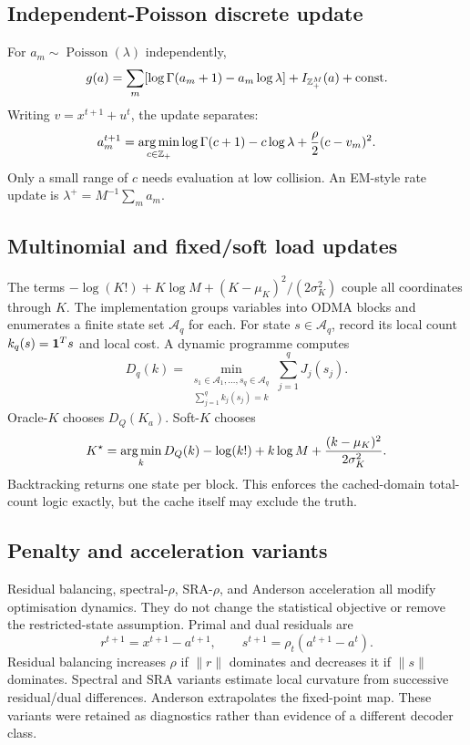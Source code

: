 \documentclass[11pt]{article}
\begin{document}
\subsection{Independent-Poisson discrete update}

For $a_m\sim\operatorname{Poisson}(\lambda)$ independently,
\[
 g(a)=\sum_m[\log\Gamma(a_m+1)-a_m\log\lambda]+I_{\mathbb{Z}_+^M}(a)+\text{const}.
\]
Writing $v=x^{t+1}+u^t$, the update separates:
\[
 a_m^{t+1}=\operatorname*{arg\,min}_{c\in\mathbb{Z}_+}
 \log\Gamma(c+1)-c\log\lambda+\frac{\rho}{2}(c-v_m)^2.
\]
Only a small range of $c$ needs evaluation at low collision. An EM-style rate update is
$\lambda^+=M^{-1}\sum_ma_m$.

\subsection{Multinomial and fixed/soft load updates}

The terms $-\log(K!)+K\log M+(K-\mu_K)^2/(2\sigma_K^2)$ couple all coordinates through $K$. The implementation
groups variables into ODMA blocks and enumerates a finite state set $\mathcal A_q$ for each. For state $s\in\mathcal
A_q$, record its local count $k_q(s)=\mathbf{1}^Ts$ and local cost. A dynamic programme computes
\[
 D_q(k)=\min_{\substack{s_1\in\mathcal A_1,\ldots,s_q\in\mathcal A_q\\
 \sum_{j=1}^qk_j(s_j)=k}}
 \sum_{j=1}^qJ_j(s_j).
\]
Oracle-$K$ chooses $D_Q(K_a)$. Soft-$K$ chooses
\[
 K^\star=\operatorname*{arg\,min}_k D_Q(k)-\log(k!)+k\log M+\frac{(k-\mu_K)^2}{2\sigma_K^2}.
\]
Backtracking returns one state per block. This enforces the cached-domain total-count logic exactly, but the cache itself
may exclude the truth.

\subsection{Penalty and acceleration variants}

Residual balancing, spectral-$\rho$, SRA-$\rho$, and Anderson acceleration all modify optimisation dynamics. They do
not change the statistical objective or remove the restricted-state assumption. Primal and dual residuals are
\[
 r^{t+1}=x^{t+1}-a^{t+1},\qquad s^{t+1}=\rho_t(a^{t+1}-a^t).
\]
Residual balancing increases $\rho$ if $\|r\|$ dominates and decreases it if $\|s\|$ dominates. Spectral and SRA
variants estimate local curvature from successive residual/dual differences. Anderson extrapolates the fixed-point
map. These variants were retained as diagnostics rather than evidence of a different decoder class.
\end{document}
